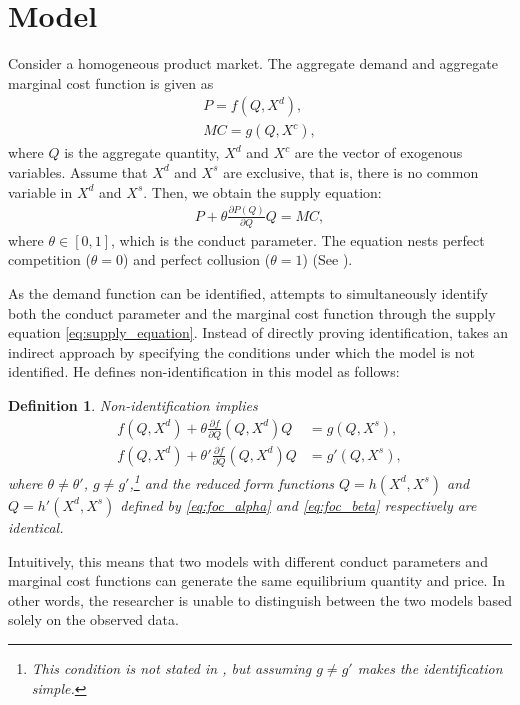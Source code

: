 \documentclass[11pt, a4paper]{article}
\newtheorem{definition}{Definition}
\theoremstyle{remark}
\begin{document}
\section{Model}
Consider a homogeneous product market.
The aggregate demand and aggregate marginal cost function is given as
\begin{align}
    P = f(Q, X^{d}), \label{eq:demand}
    \\
    MC = g(Q, X^{c}),\label{eq:marginal_cost}
\end{align}
where $Q$ is the aggregate quantity, $X^{d}$ and $X^{c}$ are the vector of exogenous variables.
Assume that $X^{d}$ and $X^{s}$ are exclusive, that is, there is no common variable in $X^{d}$ and $X^{s}$.
Then, we obtain the supply equation:
\begin{align}
     P + \theta\frac{\partial P(Q)}{\partial Q}Q = MC,\label{eq:supply_equation}
\end{align}
where $\theta\in[0,1]$, which is the conduct parameter. The equation nests perfect competition ($\theta=0$) and perfect collusion ($\theta=1$) (See \cite{bresnahan1982oligopoly}). 

As the demand function can be identified, \citet{lau1982identifying} attempts to simultaneously identify both the conduct parameter and the marginal cost function through the supply equation \eqref{eq:supply_equation}. 
Instead of directly proving identification, \citet{lau1982identifying} takes an indirect approach by specifying the conditions under which the model is not identified. 
He defines non-identification in this model as follows:
\begin{definition}\label{def:non_identification}
    Non-identification implies
    \begin{align}
    f(Q, X^{d}) + \theta \frac{\partial f}{\partial Q}(Q, X^{d})Q &= g(Q, X^{s}),\label{eq:foc_alpha}\\
    f(Q, X^{d}) + \theta' \frac{\partial f}{\partial Q}(Q, X^{d})Q &= g'(Q, X^{s}), \label{eq:foc_beta}
    \end{align}
    where $\theta \neq \theta'$, $g \ne g'$,\footnote{This condition is not stated in \citet{lau1982identifying}, but assuming $g \ne g'$ makes the identification simple.} and the reduced form functions $Q = h(X^{d}, X^{s})$ and $Q = h'(X^{d}, X^{s})$ defined by \eqref{eq:foc_alpha} and \eqref{eq:foc_beta} respectively are identical.
\end{definition}
Intuitively, this means that two models with different conduct parameters and marginal cost functions can generate the same equilibrium quantity and price. 
In other words, the researcher is unable to distinguish between the two models based solely on the observed data.
\end{document}
